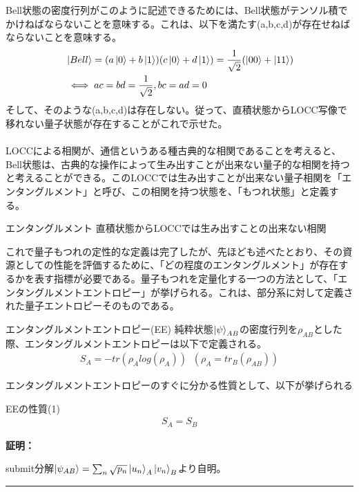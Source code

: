 \documentclass[a4paper,10.5pt]{article}
\numberwithin{equation}{section}
\newenvironment{proofbox}
{\begin{prooflabel}\textbf{証明：}\end{prooflabel}\vspace{0.8em}}
{\par\vspace{1em}\hrule\vspace{1em}}
\begin{document}
Bell状態の密度行列がこのように記述できるためには、Bell状態がテンソル積でかけねばならないことを意味する。これは、以下を満たす(a,b,c,d)が存在せねばならないことを意味する。
\begin{equation}\begin{split}
&\ket{Bell}=(a\ket{0}+b\ket{1})(c\ket{0}+d\ket{1})=\frac{1}{\sqrt{2}}(\ket{00}+\ket{11})\\
&\iff ac=bd=\frac{1}{\sqrt{2}},bc=ad=0
\end{split} \end{equation}
そして、そのような(a,b,c,d)は存在しない。従って、直積状態からLOCC写像で移れない量子状態が存在することがこれで示せた。\\
\\
LOCCによる相関が、通信というある種古典的な相関であることを考えると、Bell状態は、古典的な操作によって生み出すことが出来ない量子的な相関を持つと考えることができる。このLOCCでは生み出すことが出来ない量子相関を「エンタングルメント」と呼び、この相関を持つ状態を、「もつれ状態」と定義する。
\begin{defbox}{エンタングルメント}
直積状態からLOCCでは生み出すことの出来ない相関
\end{defbox}
これで量子もつれの定性的な定義は完了したが、先ほども述べたとおり、その資源としての性能を評価するために、「どの程度のエンタングルメント」が存在するかを表す指標が必要である。量子もつれを定量化する一つの方法として、「エンタングルメントエントロピー」が挙げられる。これは、部分系に対して定義された量子エントロピーそのものである。
\begin{defbox}{エンタングルメントエントロピー(EE)}
純粋状態$\ket{\psi}_{AB}$の密度行列を$\rho_{AB}$とした際、エンタングルメントエントロピーは以下で定義される。
\begin{equation}\begin{split}
    S_{A}=-tr(\rho_{A}log(\rho_{A}))\;\;(\rho_{A}=tr_{B}(\rho_{AB}))
\end{split} \end{equation}
\end{defbox}
エンタングルメントエントロピーのすぐに分かる性質として、以下が挙げられる
\begin{resultbox}{EEの性質(1)}
\begin{equation}\begin{split}
S_{A}=S_{B}
\end{split} \end{equation}
\end{resultbox}
\begin{proofbox}
submit分解$\ket{\psi_{AB}}=\sum_{n}\sqrt{p_{n}}\ket{u_{n}}_{A}\ket{v_{n}}_{B}$より自明。
\end{proofbox}
\end{document}

